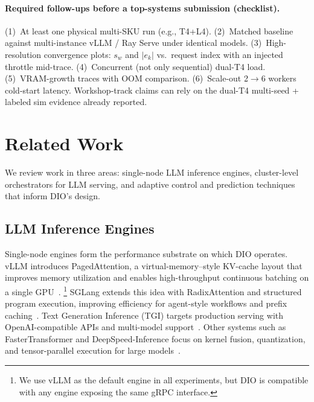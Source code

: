 \documentclass[10pt,twocolumn,letterpaper]{article}
\begin{document}
\paragraph{Required follow-ups before a top-systems submission (checklist).}
\label{sec:followups}
(1)~At least one physical multi-SKU run (e.g., T4+L4). (2)~Matched baseline against multi-instance vLLM / Ray Serve under identical models. (3)~High-resolution convergence plots: $s_w$ and $|e_k|$ vs.\ request index with an injected throttle mid-trace. (4)~Concurrent (not only sequential) dual-T4 load. (5)~VRAM-growth traces with OOM comparison. (6)~Scale-out 2$\rightarrow$6 workers cold-start latency. Workshop-track claims can rely on the dual-T4 multi-seed + labeled sim evidence already reported.


\section{Related Work}
\label{sec:related}

We review work in three areas: single-node LLM inference engines, cluster-level orchestrators for LLM serving, and adaptive control and prediction techniques that inform DIO's design.

\subsection{LLM Inference Engines}

Single-node engines form the performance substrate on which DIO operates.
vLLM introduces PagedAttention, a virtual-memory--style KV-cache layout that improves memory utilization and enables high-throughput continuous batching on a single GPU~\cite{vllm}.%
\footnote{We use vLLM as the default engine in all experiments, but DIO is compatible with any engine exposing the same gRPC interface.}
SGLang extends this idea with RadixAttention and structured program execution, improving efficiency for agent-style workflows and prefix caching~\cite{sglang}.
Text Generation Inference (TGI) targets production serving with OpenAI-compatible APIs and multi-model support~\cite{tgi}.
Other systems such as FasterTransformer and DeepSpeed-Inference focus on kernel fusion, quantization, and tensor-parallel execution for large models~\cite{fastertransformer,deepspeed}.
\end{document}
